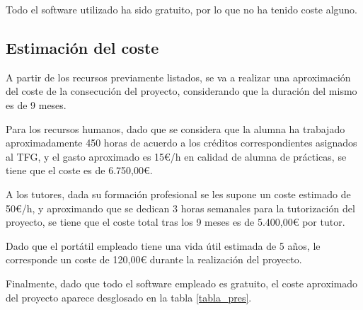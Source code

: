 Todo el software utilizado ha sido gratuito, por lo que no ha tenido coste alguno.

\subsection{Estimación del coste}

A partir de los recursos previamente listados, se va a realizar una aproximación del coste de la consecución del proyecto, considerando que la duración del mismo es de 9 meses.

Para los recursos humanos, dado que se considera que la alumna ha trabajado aproximadamente 450 horas de acuerdo a los créditos correspondientes asignados al TFG, y el gasto aproximado es 15€/h en calidad de alumna de prácticas, se tiene que el coste es de 6.750,00€.

A los tutores, dada su formación profesional se les supone un coste estimado de 50€/h, y aproximando que se dedican 3 horas semanales para la tutorización del proyecto, se tiene que el coste total tras los 9 meses es de 5.400,00€ por tutor.

Dado que el portátil empleado tiene una vida útil estimada de 5 años, le corresponde un coste de 120,00€ durante la realización del proyecto.

Finalmente, dado que todo el software empleado es gratuito, el coste aproximado del proyecto aparece desglosado en la tabla \eqref{tabla_pres}.

